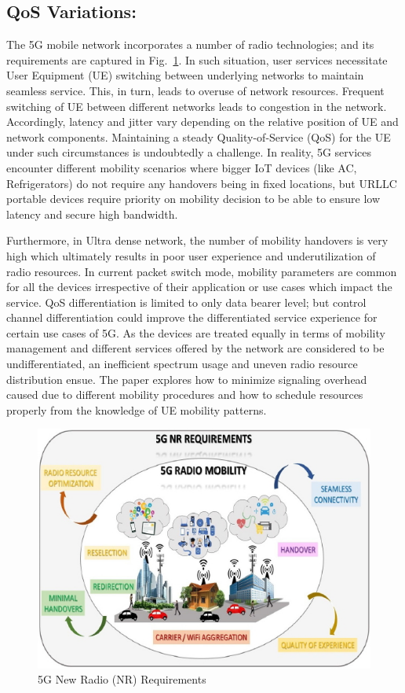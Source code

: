 \begin{multicols}{2}
\subsection{QoS Variations:}

The 5G mobile network incorporates a number of radio technologies; and its requirements are captured in Fig.~\ref{chap1-fig02}. In such situation, user services necessitate User Equipment (UE) switching between underlying networks to maintain seamless service. This, in turn, leads to overuse of network resources. Frequent switching of UE between different networks leads to congestion in the network. Accordingly, latency and jitter vary depending on the relative position of UE and network components. Maintaining a steady Quality-of-Service (QoS) for the UE under such circumstances is undoubtedly a challenge. In reality, 5G services encounter different mobility scenarios where bigger IoT devices (like AC, Refrigerators) do not require any handovers being in fixed locations, but URLLC portable devices require priority on mobility decision to be able to ensure low latency and secure high bandwidth.

Furthermore, in Ultra dense network, the number of mobility handovers is very high which ultimately results in poor user experience and underutilization of radio resources. In current packet switch mode, mobility parameters are common for all the devices irrespective of their application or use cases which impact the service. QoS differentiation is limited to only data bearer level; but control channel differentiation could improve the differentiated service experience for certain use cases of 5G. As the devices are treated equally in terms of mobility management and different services offered by the network are considered to be undifferentiated, an inefficient spectrum usage and uneven radio resource distribution ensue. The paper \cite{art1-key01} explores how to minimize signaling overhead caused due to different mobility procedures and how to schedule resources properly from the knowledge of UE mobility patterns.

\begin{figure}[H]
\centering
\includegraphics[scale=1.8]{src/Figures/chap1/chap1-fig02.jpg}
\caption{5G New Radio (NR) Requirements }\label{chap1-fig02}
\end{figure}



\end{multicols}
